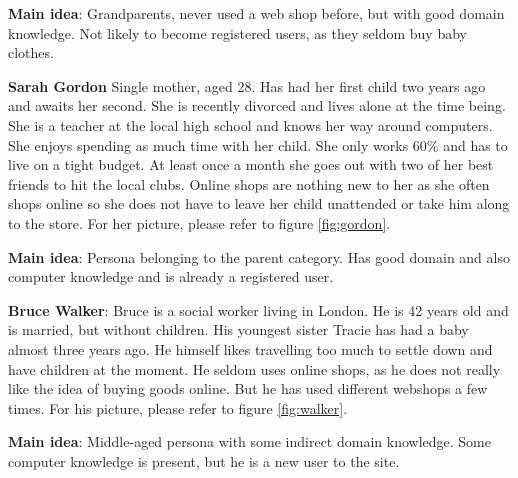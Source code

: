 \textbf{Main idea}:
Grandparents, never used a web shop before, but with good domain knowledge. Not likely to become registered users, as they seldom buy baby clothes.

\textbf{Sarah Gordon}
Single mother, aged 28. Has had her first child two years ago and awaits her second. She is recently divorced and lives alone at the time being.
She is a teacher at the local high school and knows her way around computers. 
She enjoys spending as much time with her child. She only works 60\% and has to live on a tight budget. At least once a month she goes out with two of her best friends to hit the local clubs. Online shops are nothing new to her as she often shops online so she does not have to leave her child unattended or take him along to the store.
For her picture, please refer to figure \ref{fig:gordon}.	


\textbf{Main idea}:
Persona belonging to the parent category. Has good domain and also computer knowledge and is already a registered user.

\textbf{Bruce Walker}:
Bruce is a social worker living in London. He is 42 years old and is married, but without children.
His youngest sister Tracie has had a baby almost three years ago. He himself likes travelling too much to settle down and have children at the moment.
He seldom uses online shops, as he does not really like the idea of buying goods online. But he has used different webshops a few times. For his picture, please refer to figure \ref{fig:walker}.	


\textbf{Main idea}:
Middle-aged persona with some indirect domain knowledge. Some computer knowledge is present, but he is a new user to the site.


